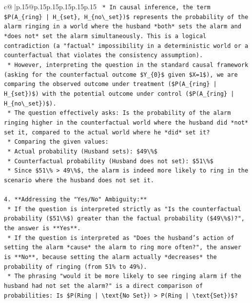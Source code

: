 \documentclass{article}
\begin{document}
{\begin{supertabular}{c@{$\;$}|p{.15\linewidth}@{}p{.15\linewidth}p{.15\linewidth}p{.15\linewidth}p{.15\linewidth}p{.15\linewidth}}
{{{\texttt{    *   In causal inference, the term \$P(A\_\{ring\} | H\_\{set\}, H\_\{no\textbackslash{}\_set\})\$ represents the probability of the alarm ringing in a world where the husband *both* sets the alarm and *does not* set the alarm simultaneously. This is a logical contradiction (a "factual" impossibility in a deterministic world or a counterfactual that violates the consistency assumption).} \\
\texttt{    *   However, interpreting the question in the standard causal framework (asking for the counterfactual outcome \$Y\_\{0\}\$ given \$X=1\$), we are comparing the observed outcome under treatment (\$P(A\_\{ring\} | H\_\{set\})\$) with the potential outcome under control (\$P(A\_\{ring\} | H\_\{no\textbackslash{}\_set\})\$).} \\
\texttt{    *   The question effectively asks: Is the probability of the alarm ringing higher in the counterfactual world where the husband did *not* set it, compared to the actual world where he *did* set it?} \\
\texttt{    *   Comparing the given values:} \\
\texttt{        *   Actual probability (Husband sets): \$49\textbackslash{}\%\$} \\
\texttt{        *   Counterfactual probability (Husband does not set): \$51\textbackslash{}\%\$} \\
\texttt{    *   Since \$51\textbackslash{}\% > 49\textbackslash{}\%\$, the alarm is indeed more likely to ring in the scenario where the husband does not set it.} \\
\\ 
\texttt{4.  **Addressing the "Yes/No" Ambiguity:**} \\
\texttt{    *   If the question is interpreted strictly as "Is the counterfactual probability (\$51\textbackslash{}\%\$) greater than the factual probability (\$49\textbackslash{}\%\$)?", the answer is **Yes**.} \\
\texttt{    *   If the question is interpreted as "Does the husband's action of setting the alarm *cause* the alarm to ring more often?", the answer is **No**, because setting the alarm actually *decreases* the probability of ringing (from 51\% to 49\%).} \\
\texttt{    *   The phrasing "would it be more likely to see ringing alarm if the husband had not set the alarm?" is a direct comparison of probabilities: Is \$P(Ring | \textbackslash{}text\{No Set\}) > P(Ring | \textbackslash{}text\{Set\})\$?} \\
}}}
\end{supertabular}}
\end{document}
